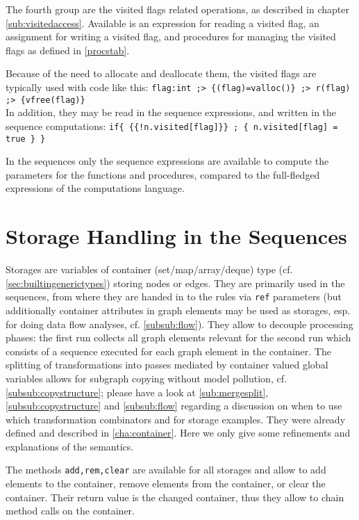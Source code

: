 The fourth group are the visited flags related operations,
as described in chapter \ref{sub:visitedaccess}.
Available is an expression for reading a visited flag, an assignment for writing a visited flag, and procedures for managing the visited flags as defined in \ref{procstab}.

\begin{example}
Because of the need to allocate and deallocate them, the visited flags are typically used with code like this:
\verb#flag:int ;> {(flag)=valloc()} ;> r(flag) ;> {vfree(flag)}#\\
In addition, they may be read in the sequence expressions, and written in the sequence computations:
\verb#if{ {{!n.visited[flag]}} ; { n.visited[flag] = true } }#
\end{example}

In the sequences only the sequence expressions are available to compute the parameters for the functions and procedures, compared to the full-fledged expressions of the computations language.


\section{Storage Handling in the Sequences}\label{sec:storages}
Storages are variables of container (set/map/array/deque) type (cf. \ref{sec:builtingenerictypes}) storing nodes or edges.
They are primarily used in the sequences, from where they are handed in to the rules via \texttt{ref} parameters (but additionally container attributes in graph elements may be used as storages,
esp. for doing data flow analyses, cf. \ref{subsub:flow}).
They allow to decouple processing phases: the first run collects all graph elements relevant for the second run which consists of a sequence executed for each graph element in the container.
The splitting of transformations into passes mediated by container valued global variables allows for subgraph copying without model pollution, cf. \ref{subsub:copystructure}; please have a look at \ref{sub:mergesplit}, \ref{subsub:copystructure} and \ref{subsub:flow} regarding a discussion on when to use which transformation combinators and for storage examples.
They were already defined and described in \ref{cha:container}.
Here we only give some refinements and explanations of the semantics.

The methods \texttt{add,rem,clear} are available for all storages and allow to add elements to the container, remove elements from the container, or clear the container.
Their return value is the changed container, thus they allow to chain method calls on the container.

